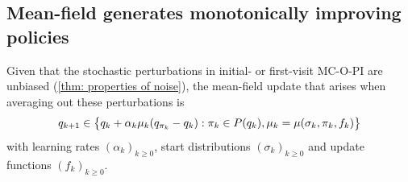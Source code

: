 \subsection{Mean-field generates monotonically improving policies}

Given that the stochastic perturbations in initial- or first-visit MC-O-PI are unbiased (\autoref{thm: properties of noise}),
the mean-field update that arises when averaging out these perturbations is
\begin{align}
\label{eq: deterministic mcopi}
    q_{k+1}
    \in
    \big\{ q_k + \alpha_k \mu_k ( q_{\pi_k} - q_k )
    :
    \pi_k \in P(q_k),
    \mu_k = \mu(\sigma_k, \pi_k, f_k)
    \big\}
\end{align}
with learning rates $(\alpha_k)_{k\ge 0}$, start distributions $(\sigma_k)_{k\ge 0}$ and update functions $(f_k)_{k\ge 0}$.








